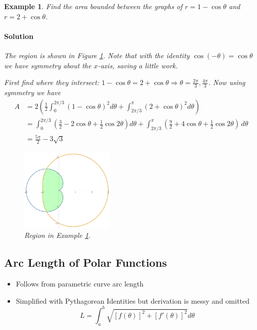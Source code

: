 \documentclass[letterpaper, 11pt, openany]{book}
\theoremstyle{mytheoremstyle}
\theoremstyle{myexamplestyle}
\newtheorem{example}{Example}[section]
\newenvironment{solution}{\paragraph{\sffamily \smaller \fontseries{b}\selectfont Solution}}{\hfill\faSquare}
\begin{document}
\begin{example}\label{e:polarbetween}
    Find the area bounded between the graphs of $r = 1 - \cos \theta$ and $r = 2 + \cos \theta$.
    \begin{solution}
        The region is shown in Figure \ref{f:polarbetween}. Note that with the identity $\cos (-\theta) = \cos \theta$ we have symmetry about the $x$-axis, saving a little work. \faSmile

        First find where they intersect: $1 - \cos \theta = 2 + \cos \theta \Rightarrow \theta = \frac{2\pi}{3}, \frac{4\pi}{3}$. Now using symmetry we have
        \begin{align*}
            A   &= 2\left( \frac{1}{2} \int_{0}^{2\pi/3}\left( 1 - \cos \theta \right)^{2} d\theta + \int_{2\pi/3}^{\pi} \left( 2 + \cos \theta \right)^{2} d\theta  \right)\\
                &= \int_{0}^{2\pi/3} \left( \frac{3}{2} - 2\cos \theta + \frac{1}{2}\cos 2\theta \right) d\theta + \int_{2\pi/3}^{\pi} \left( \frac{9}{2} + 4 \cos \theta + \frac{1}{2} \cos 2\theta \right) \, d\theta\\
                &= \frac{5\pi}{2} - 3\sqrt{3}
        \end{align*}
    \end{solution}
    \begin{figure}[htbp]
        \centering
            \includegraphics[width=0.4\textwidth]{Figures/polarbetween.png}
        \caption{Region in Example \ref{e:polarbetween}.}
        \label{f:polarbetween}
    \end{figure}
\end{example}

\subsection{Arc Length of Polar Functions}
\begin{itemize}
    \item Follows from parametric curve arc length
    \item Simplified with Pythagorean Identities but derivation is messy and omitted
    \[L = \int_{a}^{b} \sqrt{[f(\theta)]^{2} + [f'(\theta)]^{2}} d\theta\]
\end{itemize}
\end{document}
